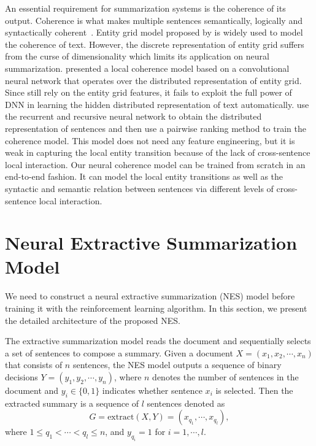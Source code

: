 \documentclass[letterpaper]{article} \usepackage{aaai18}  \usepackage{times}  \usepackage{helvet}  \usepackage{courier}  \usepackage{url}  \usepackage{graphicx}  \usepackage{amssymb}
\begin{document}
	An essential requirement for summarization systems is the coherence of its output. Coherence is what makes multiple sentences semantically, logically and syntactically coherent~\cite{Yao2017RecentAI}.  Entity grid model proposed by \cite{entitygrid} is widely used to model the coherence of text. However, the discrete representation of entity grid suffers from the curse of dimensionality which limits its application on neural summarization. \cite{nlcm} presented a local coherence model based on a convolutional neural network that operates over the distributed representation of entity grid. Since \cite{nlcm} still rely on the entity grid features, it fails to exploit the full power of DNN in learning the hidden distributed representation of text automatically. \cite{jiweili2014} use the recurrent and recursive neural network to obtain the distributed representation of sentences and then use a pairwise ranking method to train the coherence model. This model does not need any feature engineering, but it is weak in capturing the local entity transition because of the lack of cross-sentence local interaction. Our neural coherence model can be trained from scratch in an end-to-end fashion. It can model the local entity transitions as well as the syntactic and semantic relation between sentences via different levels of cross-sentence local interaction.

	\section{Neural Extractive Summarization Model}
	
	We need to construct a neural extractive summarization (NES) model before training it with the reinforcement learning algorithm. In this section, we present the detailed architecture of the proposed NES.  
	


	The extractive summarization model reads the document and sequentially selects a set of sentences to compose a summary. Given a document $X=(x_1, x_2, \cdots, x_n)$ that consists of $n$ sentences, the NES model outputs a sequence of binary decisions $Y=(y_1, y_2, \cdots, y_n)$, where $n$ denotes the number of sentences in the document and $y_i \in \{0,1\}$ indicates whether sentence $x_i$ is selected. Then the extracted summary is a sequence of $l$ sentences denoted as
	\[G=\text{extract}(X, Y)=(x_{q_1}, \cdots, x_{q_l}),\]
	where $1\leq q_1 < \cdots < q_l \leq n$, and $y_{q_i} = 1$ for $i=1,\cdots,l$.
	
\end{document}
